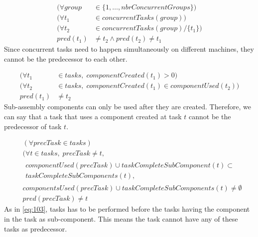   \begin{equation}
  \begin{aligned}\label{eq:88}
  (\forall group &\in \{1 , \ldots , nbrConcurrentGroups\}) \\
  (\forall t_1 &\in concurrentTasks(group)) \\
  (\forall t_2 &\in concurrentTasks(group) / \{t_1\}) \\
  pred(t_1) &\neq t_2 \land pred(t_2) \neq t_1
  \end{aligned}
  \end{equation}
  Since concurrent tasks need to happen simultaneously on different machines, they cannot be the predecessor to each other.
  
  \begin{equation}
  \begin{aligned}\label{eq:89}
  (\forall t_1 &\in tasks, \; componentCreated(t_1) > 0) \\
  (\forall t_2 &\in tasks, \; componentCreated(t_1) \in componentUsed(t_2)) \\
  pred(t_1) &\neq t_2
  \end{aligned}
  \end{equation}
 Sub-assembly components can only be used after they are created. Therefore, we can say that a task that uses a component created at task $t$ cannot be the predecessor of task $t$.
  
  \begin{equation}
  \begin{aligned}\label{eq:90}
  &(\forall precTask \in tasks) \\
  &(\forall t \in tasks, \; precTask \neq t,\\
  &\begin{aligned}componentUsed(precTask) \cup taskCompleteSubComponent(t) \subset\\
  taskCompleteSubComponents(t), \end{aligned}\\
  &componentsUsed(precTask) \cup taskCompleteSubComponents(t) \neq \emptyset \\
  &pred(precTask) \neq t
  \end{aligned}
  \end{equation}
 As in \ref{eq:103}, tasks has to be performed before the tasks having the component in the task as sub-component. This means the task cannot have any of these tasks as predecessor.
  
